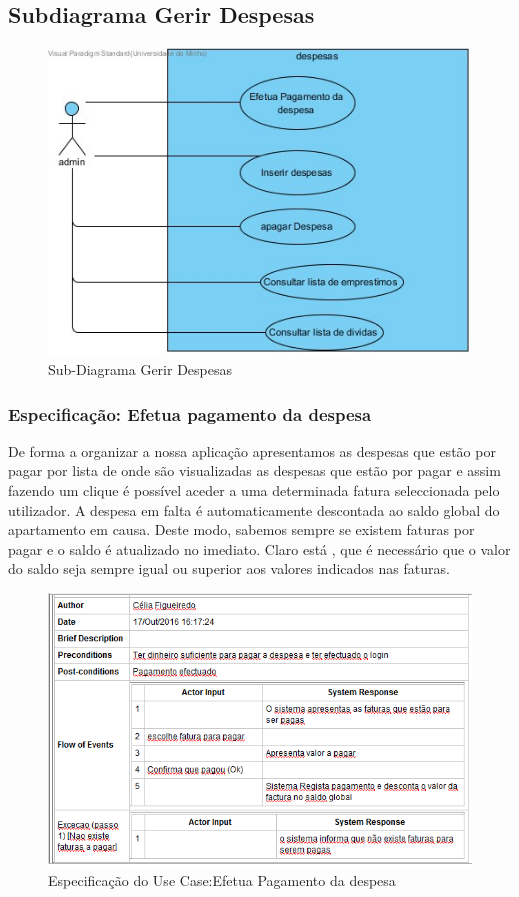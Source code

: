 \newpage

\subsection{Subdiagrama Gerir Despesas}

\begin{figure}[htb!]
	\centering
	\includegraphics[scale=0.5]{imagens/UseCase/GerirDespesas}  
	\caption{Sub-Diagrama Gerir Despesas }  
\end{figure}

\subsubsection{Especificação: Efetua pagamento da despesa}

De forma a organizar a nossa aplicação apresentamos as despesas que estão por pagar por lista de onde são visualizadas as despesas que estão por pagar e assim fazendo um clique é possível aceder a uma determinada fatura seleccionada pelo utilizador.  A despesa em falta é automaticamente descontada ao saldo global do apartamento em causa. Deste modo, sabemos sempre se existem faturas por pagar e o saldo é atualizado no imediato. Claro está , que é necessário que o valor do saldo seja sempre igual ou superior aos valores indicados nas faturas.


\begin{figure}[htb!]
	\centering
	\includegraphics[scale=0.6]{imagens/Especificacoes/efetuapagdespesa}  
	\caption{Especificação do Use Case:Efetua Pagamento da despesa  }  
\end{figure}

